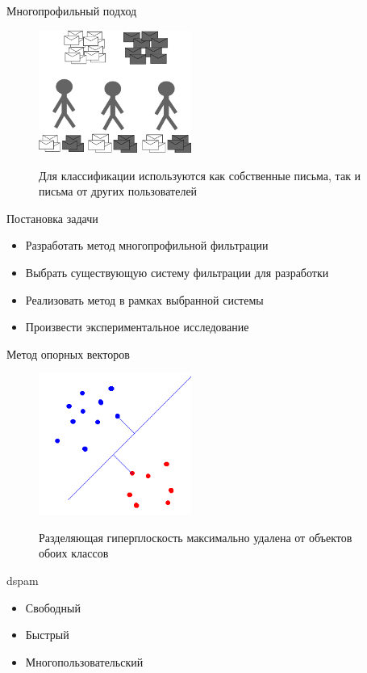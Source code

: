 \documentclass{beamer}
\begin{document}
\begin{frame}{Многопрофильный подход}
\begin{figure}[h]
\begin{center}
    \includegraphics[width=5cm]{img/multiprofile}
\end{center}
    Для классификации используются как собственные письма, так и письма от других пользователей
\end{figure}
\end{frame}
\begin{frame}{Постановка задачи}
\begin{itemize}
    \item Разработать метод многопрофильной фильтрации
    \item Выбрать существующую систему фильтрации для разработки
    \item Реализовать метод в рамках выбранной системы
    \item Произвести экспериментальное исследование
\end{itemize}
\end{frame}

\begin{frame}{Метод опорных векторов}
\begin{figure}[h]
\begin{center}
    \includegraphics[width=5cm]{../img/svm}
\end{center}
    Разделяющая гиперплоскость максимально удалена от объектов обоих классов
\end{figure}
\end{frame}


\begin{frame}{dspam}
    \begin{itemize}
        \item Свободный
        \item Быстрый
        \item Многопользовательский
    \end{itemize}
\end{frame}
\end{document}
